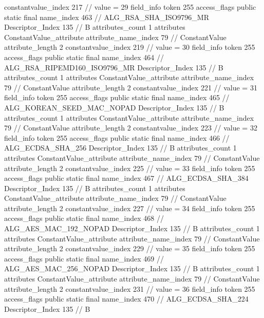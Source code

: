 {{{{{{{					constantvalue_index	217		// value = 29
				}
				}
			}
			field_info {
				token	255
				access_flags	public static final
				name_index	463		// ALG_RSA_SHA_ISO9796_MR
				Descriptor_Index	135		// B
				attributes_count	1
				attributes {
				ConstantValue_attribute {
					attribute_name_index	79		// ConstantValue
					attribute_length	2
					constantvalue_index	219		// value = 30
				}
				}
			}
			field_info {
				token	255
				access_flags	public static final
				name_index	464		// ALG_RSA_RIPEMD160_ISO9796_MR
				Descriptor_Index	135		// B
				attributes_count	1
				attributes {
				ConstantValue_attribute {
					attribute_name_index	79		// ConstantValue
					attribute_length	2
					constantvalue_index	221		// value = 31
				}
				}
			}
			field_info {
				token	255
				access_flags	public static final
				name_index	465		// ALG_KOREAN_SEED_MAC_NOPAD
				Descriptor_Index	135		// B
				attributes_count	1
				attributes {
				ConstantValue_attribute {
					attribute_name_index	79		// ConstantValue
					attribute_length	2
					constantvalue_index	223		// value = 32
				}
				}
			}
			field_info {
				token	255
				access_flags	public static final
				name_index	466		// ALG_ECDSA_SHA_256
				Descriptor_Index	135		// B
				attributes_count	1
				attributes {
				ConstantValue_attribute {
					attribute_name_index	79		// ConstantValue
					attribute_length	2
					constantvalue_index	225		// value = 33
				}
				}
			}
			field_info {
				token	255
				access_flags	public static final
				name_index	467		// ALG_ECDSA_SHA_384
				Descriptor_Index	135		// B
				attributes_count	1
				attributes {
				ConstantValue_attribute {
					attribute_name_index	79		// ConstantValue
					attribute_length	2
					constantvalue_index	227		// value = 34
				}
				}
			}
			field_info {
				token	255
				access_flags	public static final
				name_index	468		// ALG_AES_MAC_192_NOPAD
				Descriptor_Index	135		// B
				attributes_count	1
				attributes {
				ConstantValue_attribute {
					attribute_name_index	79		// ConstantValue
					attribute_length	2
					constantvalue_index	229		// value = 35
				}
				}
			}
			field_info {
				token	255
				access_flags	public static final
				name_index	469		// ALG_AES_MAC_256_NOPAD
				Descriptor_Index	135		// B
				attributes_count	1
				attributes {
				ConstantValue_attribute {
					attribute_name_index	79		// ConstantValue
					attribute_length	2
					constantvalue_index	231		// value = 36
				}
				}
			}
			field_info {
				token	255
				access_flags	public static final
				name_index	470		// ALG_ECDSA_SHA_224
				Descriptor_Index	135		// B
}}}}}
